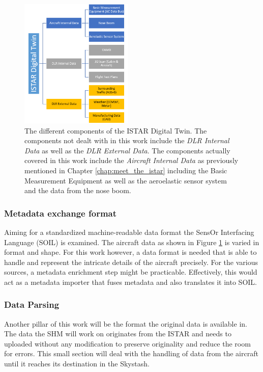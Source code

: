 \begin{figure}[h]
    \centering
    \includegraphics[width=0.48\textwidth]{03_figures/DIGECAT}
    \caption[Components of the Digital Twin]{The different components of the ISTAR Digital Twin. The components not dealt with in this work include the \textit{DLR Internal Data} as well as the \textit{DLR External Data}. The components actually covered in this work include the \textit{Aircraft Internal Data} as previously mentioned in Chapter \ref{chap:meet_the_istar} including the Basic Measurement Equipment as well as the aeroelastic sensor system and the data from the nose boom. \cite{arts_digital_2022}}
    \label{fig:digecat_data_sources}
\end{figure}

\subsubsection{Metadata exchange format}
\label{chap:2-metadata-format}

Aiming for a standardized machine-readable data format the SensOr Interfacing Language (SOIL) is examined. The aircraft data as shown in Figure \ref{fig:digecat_data_sources} is varied in format and shape. For this work however, a data format is needed that is able to handle and represent the intricate details of the aircraft precisely. For the various sources, a metadata enrichment step might be practicable. Effectively, this would act as a metadata importer that fuses metadata and also translates it into SOIL.


\subsubsection{Data Parsing}
Another pillar of this work will be the format the original data is available in. The data the SHM will work on originates from the ISTAR and needs to uploaded without any modification to preserve originality and reduce the room for errors. This small section will deal with the handling of data from the aircraft until it reaches its destination in the Skystash.

